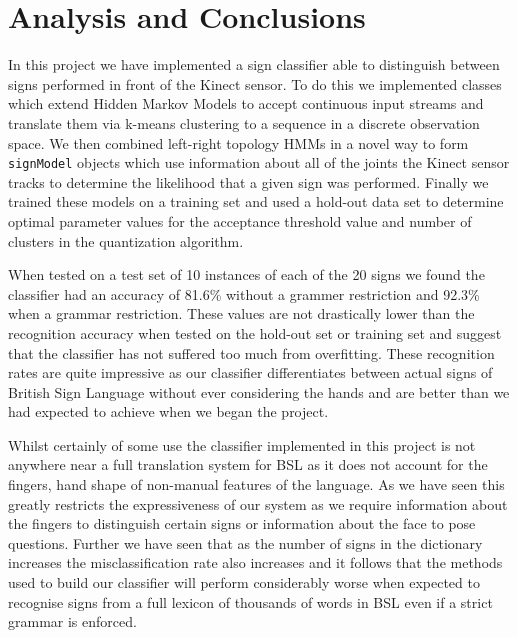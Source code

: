 \def\baselinestretch{1}
\chapter{Analysis and Conclusions}
\ifpdf
    \graphicspath{{Conclusions/ConclusionsFigs/PNG/}{Conclusions/ConclusionsFigs/PDF/}{Conclusions/ConclusionsFigs/}}
\else
    \graphicspath{{Conclusions/ConclusionsFigs/EPS/}{Conclusions/ConclusionsFigs/}}
\fi

\def\baselinestretch{1.66}

In this project we have implemented a sign classifier able to distinguish between signs performed in front of the Kinect sensor. To do this we implemented classes which extend Hidden Markov Models to accept continuous input streams and translate them via k-means clustering to a sequence in a discrete observation space. We then combined left-right topology HMMs in a novel way to form \verb|signModel| objects which use information about all of the joints the Kinect sensor tracks to determine the likelihood that a given sign was performed. Finally we trained these models on a training set and used a hold-out data set to determine optimal parameter values for the acceptance threshold value and number of clusters in the quantization algorithm.

When tested on a test set of 10 instances of each of the 20 signs we found the classifier had an accuracy of 81.6\% without a grammer restriction and 92.3\% when a grammar restriction. These values are not drastically lower than the recognition accuracy when tested on the hold-out set or training set and suggest that the classifier has not suffered too much from overfitting. These recognition rates are quite impressive as our classifier differentiates between actual signs of British Sign Language without ever considering the hands and are better than we had expected to achieve when we began the project.

Whilst certainly of some use the classifier implemented in this project is not anywhere near a full translation system for BSL as it does not account for the fingers, hand shape of non-manual features of the language. As we have seen this greatly restricts the expressiveness of our system as we require information about the fingers to distinguish certain signs or information about the face to pose questions. Further we have seen that as the number of signs in the dictionary increases the misclassification rate also increases and it follows that the methods used to build our classifier will perform considerably worse when expected to recognise signs from a full lexicon of thousands of words in BSL even if a strict grammar is enforced.

